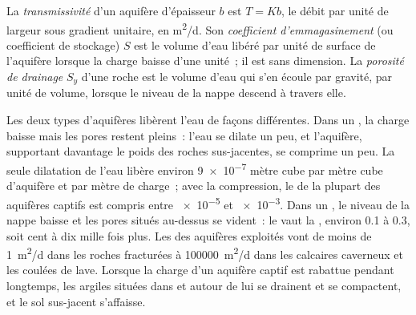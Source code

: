 \begin{definition}\label{def:b3:hydrogeology:storage}
La \emph{transmissivité} d'un aquifère d'épaisseur
$b$ est $T = Kb$, le débit par unité de largeur sous gradient unitaire, en
\unit{m^2/d}. Son \emph{coefficient d'emmagasinement} (ou
coefficient de stockage) $S$ est le volume d'eau libéré par unité de surface de
l'aquifère lorsque la charge baisse d'une unité~; il est sans dimension. La
\emph{porosité de drainage} $S_y$ d'une roche est le volume
d'eau qui s'en écoule par gravité, par unité de volume, lorsque le
niveau de la nappe descend à travers elle.
\end{definition}

Les deux types d'aquifères libèrent l'eau de façons différentes. Dans un , la charge baisse mais les pores restent pleins~: l'eau se dilate un
peu, et l'aquifère, supportant davantage le poids des roches sus-jacentes, se comprime un
peu. La seule dilatation de l'eau libère environ
\num{9e-7} mètre cube par mètre cube d'aquifère et par mètre de charge~; avec la
compression, le  de la plupart des aquifères captifs est
compris entre \num{e-5} et \num{e-3}. Dans un , le niveau de la nappe baisse et
les pores situés au-dessus se vident~: le  vaut la , environ 0.1
à 0.3, soit cent à dix mille fois plus. Les  des
aquifères exploités vont de moins de \qty{1}{m^2/d} dans les roches fracturées
à \qty{100000}{m^2/d} dans les calcaires caverneux et les coulées de lave. Lorsque la
charge d'un aquifère captif est rabattue pendant longtemps, les argiles situées dans et
autour de lui se drainent et se compactent, et le sol sus-jacent s'affaisse.

